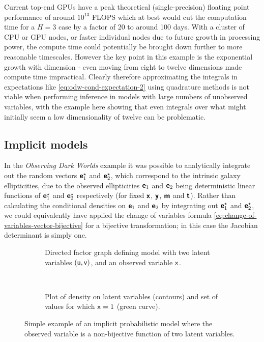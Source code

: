 Current top-end \acp{GPU} have a peak theoretical (single-precision) floating point performance of around $10^{13}$ \ac{FLOPS} which at best would cut the computation time for a $H=3$ case by a factor of 20 to around 100 days. With a cluster of \ac{CPU} or \ac{GPU} nodes, or faster individual nodes due to future growth in processing power, the compute time could potentially be brought down further to more reasonable timescales. However the key point in this example is the exponential growth with dimension - even moving from eight to twelve dimensions made compute time impractical. Clearly therefore approximating the integrals in expectations like \eqref{eq:odw-cond-expectation-2} using quadrature methods is not viable when performing inference in models with large numbers of unobserved variables, with the example here showing that even integrals over what might initially seem a low dimensionality of twelve can be problematic.

\subsection{Implicit models}\label{subsec:implicit-models}

In the \emph{Observing Dark Worlds} example it was possible to analytically integrate out the random vectors $\boldsymbol{\mathsf{e}}_1^\star$ and $\boldsymbol{\mathsf{e}}_2^\star$, which correspond to the intrinsic galaxy ellipticities, due to the observed ellipticities $\boldsymbol{\mathsf{e}}_1$ and $\boldsymbol{\mathsf{e}}_2$ being deterministic linear functions of $\boldsymbol{\mathsf{e}}_1^\star$ and $\boldsymbol{\mathsf{e}}_2^\star$ respectively (for fixed $\boldsymbol{\mathsf{x}}$, $\boldsymbol{\mathsf{y}}$, $\boldsymbol{\mathsf{m}}$ and $\boldsymbol{\mathsf{t}}$). Rather than calculating the conditional densities on $\boldsymbol{\mathsf{e}}_1$ and $\boldsymbol{\mathsf{e}}_2$ by integrating out $\boldsymbol{\mathsf{e}}_1^\star$ and $\boldsymbol{\mathsf{e}}_2^\star$, we could equivalently have applied the change of variables formula \eqref{eq:change-of-variables-vector-bijective} for a bijective transformation; in this case the Jacobian determinant is simply one.

\begin{figure}[t]
\centering
\begin{subfigure}[b]{.48\linewidth}
\centering
{}
\caption{Directed factor graph defining model with two latent variables $(\mathsf{u}, \mathsf{v})$, and an observed variable $\mathsf{x}$.}
\label{sfig:simple-impl-factor-graph}
\end{subfigure}
~~
\begin{subfigure}[b]{.48\linewidth}
\centering
{}
\caption{Plot of density on latent variables (contours) and set of values for which $\mathsf{x} = 1$ (green curve).}
\label{sfig:example-implicit-model-cond-plot}
\end{subfigure}
\caption[Example of implicit probabilistic model.]{Simple example of an implicit probabilistic model where the observed variable is a non-bijective function of two latent variables.}
\label{fig:example-non-bijective-transform-factor-graph}
\end{figure}

